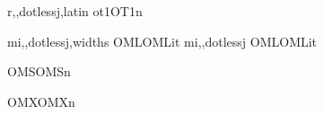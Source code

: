 

\installfonts
\ifr  {}				\fi
\ifmi {}	\fi
\ifsy {}		\fi
\ifex {}				\fi

\ifr
{}%
    {\mathfont r\optical,\romanfont,dotlessj,latin}%
    {ot1}{OT1}{\mathfont}{\weightletter}{n}{}
\fi

\ifmi
\ifwidths
{}%
    {\mathfont mi\optical,\italicfont,dotlessj,widths}%
    {OML}{OML}{\mathfont}{\weightletter}{it}{}
\else
{}%
    {\mathfont mi\optical,\italicfont,dotlessj}%
    {OML}{OML}{\mathfont}{\weightletter}{it}{}
\fi
\fi

\ifsy
{}%
    {OMS}{OMS}{\mathfont}{\weightletter}{n}{}
\fi

\ifex
{}%
    {OMX}{OMX}{\mathfont}{\weightletter}{n}{}
\fi

\endinstallfonts

\bye
